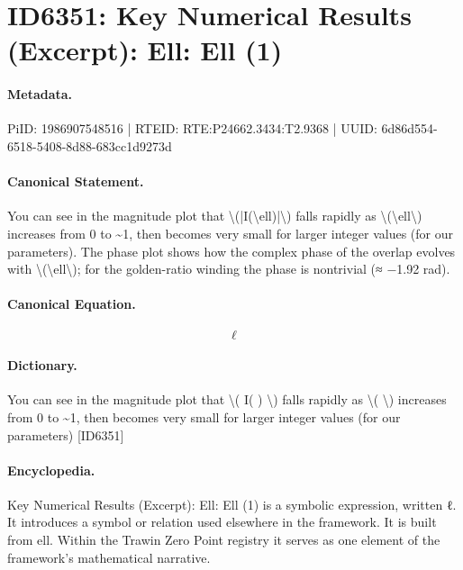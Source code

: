 \section*{ID6351: Key Numerical Results (Excerpt): Ell: Ell (1)}
\paragraph{Metadata.}
PiID: 1986907548516 | RTEID: RTE:P24662.3434:T2.9368 | UUID: 6d86d554-6518-5408-8d88-683cc1d9273d

\paragraph{Canonical Statement.}
You can see in the magnitude plot that \textbackslash{}(|I(\textbackslash{}ell)|\textbackslash{}) falls rapidly as \textbackslash{}(\textbackslash{}ell\textbackslash{}) increases from 0 to \textasciitilde{}1, then becomes very small for larger integer values (for our parameters). The phase plot shows how the complex phase of the overlap evolves with \textbackslash{}(\textbackslash{}ell\textbackslash{}); for the golden-ratio winding the phase is nontrivial (≈ −1.92 rad).

\paragraph{Canonical Equation.}
\[
\ell
\]

\paragraph{Dictionary.}
You can see in the magnitude plot that \textbackslash{}( I( ) \textbackslash{}) falls rapidly as \textbackslash{}( \textbackslash{}) increases from 0 to \textasciitilde{}1, then becomes very small for larger integer values (for our parameters) [ID6351]

\paragraph{Encyclopedia.}
Key Numerical Results (Excerpt): Ell: Ell (1) is a symbolic expression, written ℓ. It introduces a symbol or relation used elsewhere in the framework. It is built from ell. Within the Trawin Zero Point registry it serves as one element of the framework's mathematical narrative.
